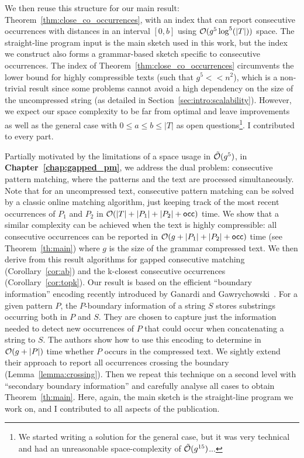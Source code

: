 We then reuse this structure for our main result: Theorem~\ref{thm:close_co_occurrences}, with an index that can report consecutive occurrences with distances in an interval $[0,b]$ using $\mathcal{O} (g^5\log^5(|T|))$ space.
The straight-line program input is the main sketch used in this work, but the index we construct also forms a grammar-based sketch specific to consecutive occurrences.
The index of Theorem~\ref{thm:close_co_occurrences} circumvents the lower bound for highly compressible texts (such that $g^5 << n^2$), which is a non-trivial result since some problems cannot avoid a high dependency on the size of the uncompressed string (as detailed in Section~\ref{sec:intro:scalability}). However, we expect our space complexity to be far from optimal and leave improvements as well as the general case with $0 \leq a \leq b \leq |T|$ as open questions\footnote{We started writing a solution for the general case, but it was very technical and had an unreasonable space-complexity of $\tilde {\mathcal{O}}(g^{15})$...}. I contributed to every part.


Partially motivated by the limitations of a space usage in $\tilde {\mathcal{O}}(g^5)$, in \textbf{Chapter~\ref{chap:gapped_pm}}, we address the dual problem: consecutive pattern matching, where the patterns and the text are processed simultaneously. Note that for an uncompressed text, consecutive pattern matching can be solved by a classic online matching algorithm, just keeping track of the most recent occurrences of $P_1$ and $P_2$ in $\mathcal{O}(|T|+|P_1|+|P_2|+\mathsf{occ})$ time.
We show that a similar complexity can be achieved when the text is highly compressible: all consecutive occurrences can be reported in $\mathcal{O}(g+|P_1|+|P_2|+\mathsf{occ})$ time (see Theorem~\ref{th:main}) where $g$ is the size of the grammar compressed text. We then derive from this result algorithms for gapped consecutive matching (Corollary~\ref{cor:ab}) and the k-closest consecutive occurrences (Corollary~\ref{cor:topk}).
Our result is based on the efficient ``boundary information'' encoding recently introduced by Ganardi and Gawrychowski~\cite{DBLP:conf/soda/GanardiG22}. For a given pattern $P$, the $P$-boundary information of a string $S$ stores substrings occurring both in $P$ and $S$. They are chosen to capture just the information needed to detect new occurrences of $P$ that could occur when concatenating a string to $S$.
The authors show how to use this encoding to determine in $\mathcal{O}(g+|P|)$ time whether $P$ occurs in the compressed text. We sightly extend their approach to report all occurrences crossing the boundary (Lemma~\ref{lemma:crossing}). Then we repeat this technique on a second level with ``secondary boundary information'' and carefully analyse all cases to obtain Theorem~\ref{th:main}. Here, again, the main sketch is the straight-line program we work on, and I contributed to all aspects of the publication.


